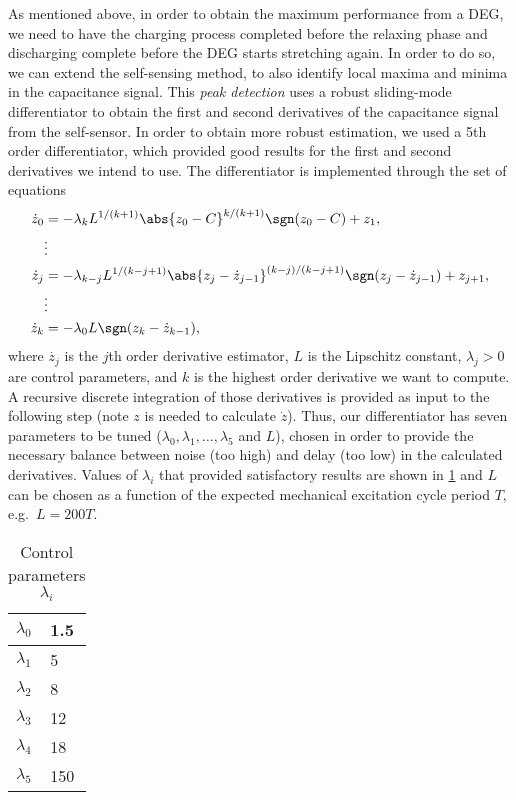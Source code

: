 As mentioned above, in order to obtain the maximum performance from a DEG, we need to have the charging process completed before the relaxing phase and discharging complete before the DEG starts stretching again. In order to do so, we can extend the self-sensing method, to also identify local maxima and minima in the capacitance signal.
This \emph{peak detection} uses a robust sliding-mode differentiator\cite{Shtessel2014SlidingObservation} to obtain the first and second derivatives of the capacitance signal from the self-sensor. In order to obtain more robust estimation, we used a 5th order differentiator, which provided good results for the first and second derivatives we intend to use. The differentiator is implemented through the set of equations
\begin{align}\label{eq:diff}
\dot{z}_0 &= -\lambda_{k}L^{1/(k+1)}\abs{z_0-C}^{k/(k+1)}\sgn(z_0-C)+z_1,  \nonumber\\
&\vdots \nonumber\\
\dot{z}_j &= -\lambda_{k-j}L^{1/(k-j+1)}\abs{z_{j}-\dot{z}_{j-1}}^{(k-j)/(k-j+1)}\sgn(z_{j}-\dot{z}_{j-1})+z_{j+1}, \\
&\vdots \nonumber\\
\dot{z}_k &= -\lambda_{0}L \sgn(z_{k}-\dot{z}_{k-1}),\nonumber
\end{align}
where $\dot{z_j}$ is the $j$th order derivative estimator, $L$ is the Lipschitz constant\cite{Shtessel2014SlidingObservation}, $\lambda_j>0$ are 
control parameters, and $k$ is the highest order derivative we want to compute. A recursive discrete integration of those derivatives is provided as input to the following step (note $z$ is needed to calculate $\dot{z}$). Thus, our differentiator has seven parameters to be tuned ($\lambda_0,\lambda_1, \ldots, \lambda_5$ and $L$), chosen in order to provide the necessary balance between noise (too high) and delay (too low) in the calculated derivatives. Values of $\lambda_i$ that provided satisfactory results are shown in \cref{tab:parameters} and $L$ can be chosen as a function of the expected mechanical excitation cycle period $T$, e.g.\ $L = 200T$.
\begin{table}[ht]
\caption{Control parameters $\lambda_i$} 
\label{tab:parameters}
\begin{center}       
\begin{tabular}{|l|l|} %
\hline
\rule[-1ex]{0pt}{3.5ex}  $\lambda_0$ & 1.5  \\
\hline
\rule[-1ex]{0pt}{3.5ex}  $\lambda_1$ & 5  \\
\hline
\rule[-1ex]{0pt}{3.5ex}  $\lambda_2$ & 8  \\
\hline
\rule[-1ex]{0pt}{3.5ex}  $\lambda_3$ & 12  \\
\hline
\rule[-1ex]{0pt}{3.5ex}  $\lambda_4$ & 18  \\
\hline
\rule[-1ex]{0pt}{3.5ex}  $\lambda_5$ & 150  \\
\hline
\end{tabular}
\end{center}
\end{table} 
